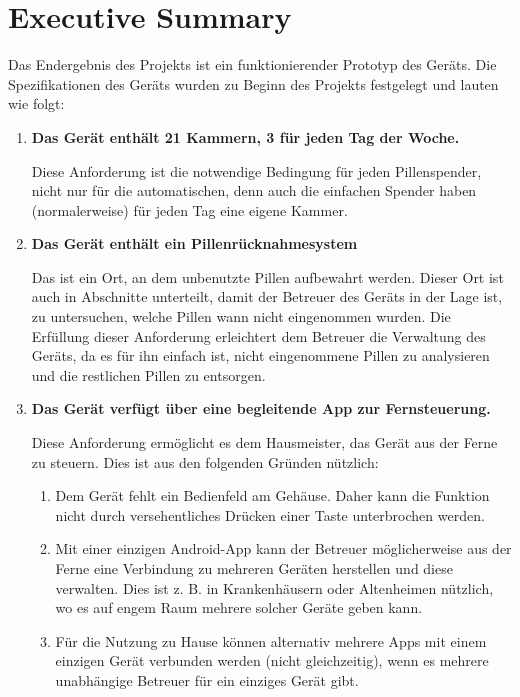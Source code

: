 \section*{Executive Summary}
Das Endergebnis des Projekts ist ein funktionierender Prototyp des Geräts. Die Spezifikationen des Geräts wurden zu Beginn des Projekts festgelegt und lauten wie folgt:
\begin{enumerate}
\item{\textbf{Das Gerät enthält 21 Kammern, 3 für jeden Tag der Woche.}} 

Diese Anforderung ist die notwendige Bedingung für jeden Pillenspender, nicht nur für die automatischen, denn auch die einfachen Spender haben (normalerweise) für jeden Tag eine eigene Kammer.
\item{\textbf{Das Gerät enthält ein Pillenrücknahmesystem }}

 Das ist ein Ort, an dem unbenutzte Pillen aufbewahrt werden. Dieser Ort ist auch in Abschnitte unterteilt, damit der Betreuer des Geräts in der Lage ist, zu untersuchen, welche Pillen wann nicht eingenommen wurden. Die Erfüllung dieser Anforderung erleichtert dem Betreuer die Verwaltung des Geräts, da es für ihn einfach ist, nicht eingenommene Pillen zu analysieren und die restlichen Pillen zu entsorgen.
 
\item{\textbf{Das Gerät verfügt über eine begleitende App zur Fernsteuerung.}} 

Diese Anforderung ermöglicht es dem Hausmeister, das Gerät aus der Ferne zu steuern. Dies ist aus den folgenden Gründen nützlich:

\begin{enumerate}
	\item Dem Gerät fehlt ein Bedienfeld am Gehäuse. Daher kann die Funktion nicht durch versehentliches Drücken einer Taste unterbrochen werden.
	\item Mit einer einzigen Android-App kann der Betreuer möglicherweise aus der Ferne eine Verbindung zu mehreren Geräten herstellen und diese verwalten. Dies ist z. B. in Krankenhäusern oder Altenheimen nützlich, wo es auf engem Raum mehrere solcher Geräte geben kann.
	\item Für die Nutzung zu Hause können alternativ mehrere Apps mit einem einzigen Gerät verbunden werden (nicht gleichzeitig), wenn es mehrere unabhängige Betreuer für ein einziges Gerät gibt.
\end{enumerate}
\end{enumerate}

